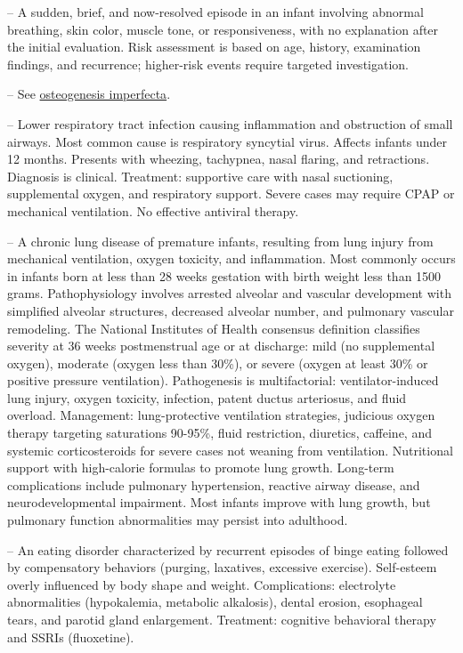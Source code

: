 -- A sudden, brief, and now-resolved episode in an infant involving abnormal breathing, skin color, muscle tone, or responsiveness, with no explanation after the initial evaluation. Risk assessment is based on age, history, examination findings, and recurrence; higher-risk events require targeted investigation.

-- See \hyperlink{Osteogenesis Imperfecta}{osteogenesis imperfecta}.

-- Lower respiratory tract infection causing inflammation and obstruction of small airways. Most common cause is respiratory syncytial virus. Affects infants under 12 months. Presents with wheezing, tachypnea, nasal flaring, and retractions. Diagnosis is clinical. Treatment: supportive care with nasal suctioning, supplemental oxygen, and respiratory support. Severe cases may require CPAP or mechanical ventilation. No effective antiviral therapy.

-- A chronic lung disease of premature infants, resulting from lung injury from mechanical ventilation, oxygen toxicity, and inflammation. Most commonly occurs in infants born at less than 28 weeks gestation with birth weight less than 1500 grams. Pathophysiology involves arrested alveolar and vascular development with simplified alveolar structures, decreased alveolar number, and pulmonary vascular remodeling. The National Institutes of Health consensus definition classifies severity at 36 weeks postmenstrual age or at discharge: mild (no supplemental oxygen), moderate (oxygen less than 30\%), or severe (oxygen at least 30\% or positive pressure ventilation). Pathogenesis is multifactorial: ventilator-induced lung injury, oxygen toxicity, infection, patent ductus arteriosus, and fluid overload. Management: lung-protective ventilation strategies, judicious oxygen therapy targeting saturations 90-95\%, fluid restriction, diuretics, caffeine, and systemic corticosteroids for severe cases not weaning from ventilation. Nutritional support with high-calorie formulas to promote lung growth. Long-term complications include pulmonary hypertension, reactive airway disease, and neurodevelopmental impairment. Most infants improve with lung growth, but pulmonary function abnormalities may persist into adulthood.

-- An eating disorder characterized by recurrent episodes of binge eating followed by compensatory behaviors (purging, laxatives, excessive exercise). Self-esteem overly influenced by body shape and weight. Complications: electrolyte abnormalities (hypokalemia, metabolic alkalosis), dental erosion, esophageal tears, and parotid gland enlargement. Treatment: cognitive behavioral therapy and SSRIs (fluoxetine).

